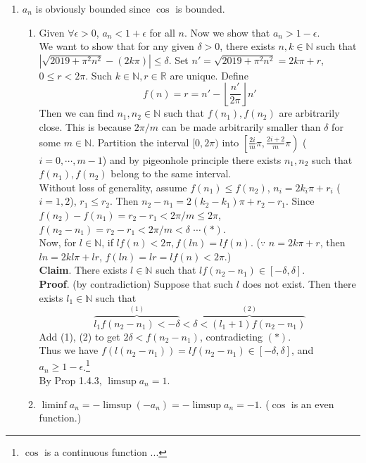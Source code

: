 \documentclass[12pt]{report}
\newcommand{\bb}[1]{\mathbb{#1}}
\newcommand{\abs}[1]{\left|#1\right|}
\begin{document}
\begin{enumerate}
\begin{enumerate}
	\item $a_n$ is obviously bounded since $\cos$ is bounded.
	\begin{enumerate}
		\item Given $\forall \epsilon > 0$, $a_n < 1+\epsilon$ for all $n$. Now we show that $a_n > 1-\epsilon$.\\
		We want to show that for any given $\delta > 0$, there exists $n, k\in \bb{N}$ such that $\abs{\sqrt{2019+\pi^2n^2} - (2k\pi)} \leq \delta$.
		Set $n' = \sqrt{2019+\pi^2n^2} = 2k\pi + r$, $0\leq r < 2\pi$. Such $k\in \bb{N}, r\in\bb{R}$ are unique.
		Define $$f(n) = r = n' - \left \lfloor\frac{n'}{2\pi}\right \rfloor n'$$Then we can find $n_1, n_2\in\bb{N}$ such that $f(n_1), f(n_2)$ are arbitrarily close. This is because $2\pi/m$ can be made arbitrarily smaller than $\delta$ for some $m\in \bb{N}$. Partition the interval $[0, 2\pi)$ into $\left [\frac{2i}{m}\pi, \frac{2i+2}{m}\pi\right )$ ($i=0, \cdots, m-1$) and by pigeonhole principle there exists $n_1, n_2$ such that $f(n_1), f(n_2)$ belong to the same interval.\\
		Without loss of generality, assume $f(n_1)\leq f(n_2)$, $n_i = 2k_i\pi + r_i$ ($i=1, 2$), $r_1\leq r_2$. Then $n_2-n_1 = 2(k_2-k_1)\pi + r_2-r_1$. Since $f(n_2)-f(n_1) = r_2 - r_1 < 2\pi/m \leq 2\pi$, $f(n_2-n_1) = r_2-r_1 < 2\pi/m < \delta$ $\cdots (*)$.\\Now, for $l\in \bb{N}$, if $lf(n) < 2\pi, f(ln)= lf(n)$. ($\because$ $n = 2k\pi + r$, then $ln = 2kl\pi+lr$, $f(ln) = lr = lf(n) < 2\pi$.)\\
		\textbf{Claim}. There exists $l\in\bb{N}$ such that $lf(n_2-n_1) \in \left[- \delta, \delta \right]$.\\
		\textbf{Proof}. (by contradiction) Suppose that such $l$ does not exist. Then there exists $l_1\in \bb{N}$ such that $$\overset{(1)}{\overbrace{l_1f(n_2-n_1) < -\delta}}<\overset{(2)}{\overbrace{\delta < (l_1+1)f(n_2-n_1)}}$$
		Add (1), (2) to get $2\delta < f(n_2-n_1)$, contradicting $(*)$.\\
		Thus we have $f(l(n_2-n_1)) = lf(n_2-n_1) \in \left[-\delta, \delta\right]$, and $a_n\geq 1-\epsilon$.\footnote{$\cos$ is a continuous function ...}
		\\By \textsf{Prop 1.4.3}, $\limsup a_n = 1$.
		
		\item $\liminf a_n = -\limsup (-a_n) = -\limsup a_n = -1$. ($\cos$ is an even function.)
	\end{enumerate}
\end{enumerate}


\end{enumerate}
\end{document}
